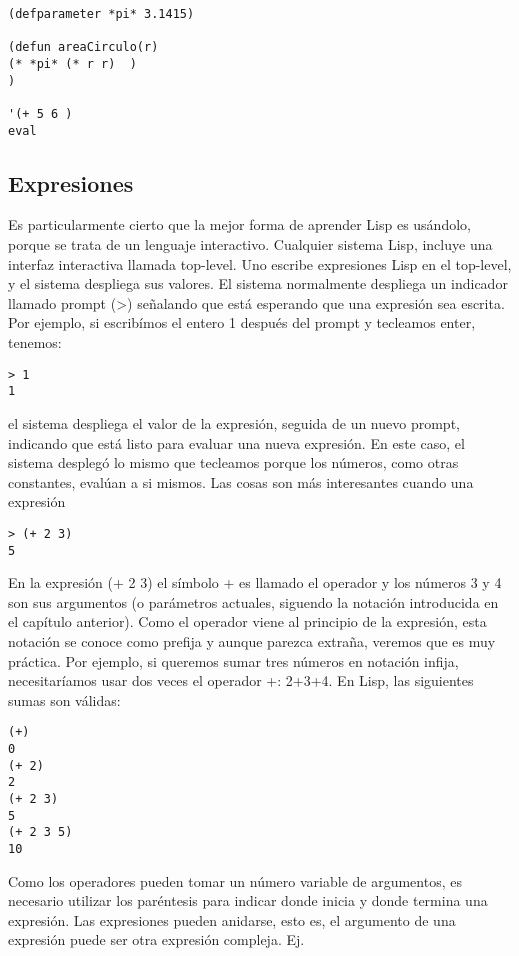 \documentclass[11pt]{article}
\begin{document}
\begin{verbatim}
(defparameter *pi* 3.1415)

(defun areaCirculo(r)
(* *pi* (* r r)  )
)

'(+ 5 6 )
eval
\end{verbatim}


\subsection*{Expresiones}
\label{sec:orgd82c906}

Es particularmente cierto que la mejor forma de aprender Lisp es
usándolo, porque se trata de un lenguaje interactivo. Cualquier
sistema Lisp, incluye una interfaz interactiva llamada top-level. Uno
escribe expresiones Lisp en el top-level, y el sistema despliega sus
valores. El sistema normalmente despliega un indicador llamado prompt
(>) señalando que está esperando que una expresión sea escrita. Por
ejemplo, si escribímos el entero 1 después del prompt y tecleamos
enter, tenemos:

\begin{verbatim}
> 1
1
\end{verbatim}

el sistema despliega el valor de la expresión, seguida de un nuevo prompt,
indicando que está listo para evaluar una nueva expresión. En este caso, el
sistema desplegó lo mismo que tecleamos porque los números, como otras
constantes, evalúan a si mismos. Las cosas son más interesantes cuando una
expresión

\begin{verbatim}
> (+ 2 3)
5
\end{verbatim}

En la expresión (+ 2 3) el símbolo + es llamado el operador y los números 3 y 4 son sus argumentos (o parámetros actuales, siguendo la notación
introducida en el capítulo anterior). Como el operador viene al principio de
la expresión, esta notación se conoce como prefija y aunque parezca extraña,
veremos que es muy práctica. Por ejemplo, si queremos sumar tres números
en notación infija, necesitaríamos usar dos veces el operador +: 2+3+4. En
Lisp, las siguientes sumas son válidas:

\begin{verbatim}
(+)
0
(+ 2)
2
(+ 2 3)
5
(+ 2 3 5)
10
\end{verbatim}

Como los operadores pueden tomar un número variable de argumentos,
es necesario utilizar los paréntesis para indicar donde inicia y donde termina
una expresión. Las expresiones pueden anidarse, esto es, el argumento de
una expresión puede ser otra expresión compleja. Ej.
\end{document}
